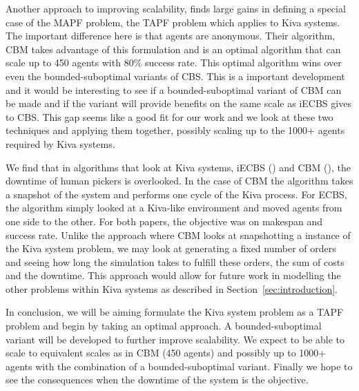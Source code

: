 \documentclass[a4paper,11pt]{article}
\begin{document}
Another approach to improving scalability, \cite{ma2016optimal} finds large gains in defining a special case of the MAPF problem, the TAPF problem which applies to Kiva systems. The important difference here is that agents are anonymous. Their algorithm, CBM takes advantage of this formulation and is an optimal algorithm that can scale up to 450 agents with 80\% success rate. This optimal algorithm wins over even the bounded-suboptimal variants of CBS. This is a important development and it would be interesting to see if a bounded-suboptimal variant of CBM can be made and if the variant will provide benefits on the same scale as iECBS gives to CBS.  This gap seems like a good fit for our work and we look at these two techniques and applying them together, possibly scaling up to the 1000+ agents required by Kiva systems.

We find that in algorithms that look at Kiva systems, iECBS (\cite{cohen2016improved})  and CBM (\cite{ma2016optimal}), the downtime of human pickers is overlooked. In the case of CBM the algorithm takes a snapshot of the system and performs one cycle of the Kiva process. For ECBS, the algorithm simply looked at a Kiva-like environment and moved agents from one side to the other. For both papers, the objective was on makespan and success rate. Unlike the approach where CBM looks at snapshotting a instance of the Kiva system problem, we may look at generating a fixed number of orders and seeing how long the simulation takes to fulfill these orders, the sum of costs and the downtime. This approach would allow for future work in modelling the other problems within Kiva systems as described in Section~\ref{sec:introduction}.

In conclusion, we will be aiming formulate the Kiva system problem as a TAPF problem and begin by taking an optimal approach. A bounded-suboptimal variant will be developed to further improve scalability. We expect to be able to scale to equivalent scales as in CBM (450 agents) and possibly up to 1000+ agents with the combination of a bounded-suboptimal variant. Finally we hope to see the consequences when the downtime of the system is the objective.




	
\end{document}
